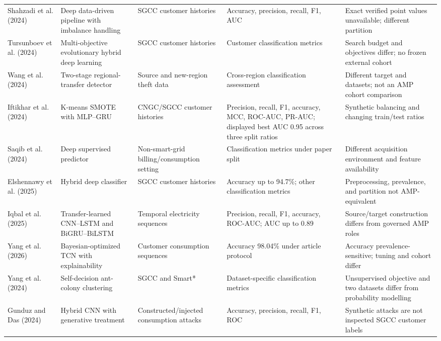 \begin{longtable}{@{}p{}p{}p{}p{}p{}@{}}
Shahzadi et al. (2024) & Deep data-driven pipeline with imbalance handling & SGCC customer histories & Accuracy, precision, recall, F1, AUC & Exact verified point values unavailable; different partition \\
Tursunboev et al. (2024) & Multi-objective evolutionary hybrid deep learning & SGCC customer histories & Customer classification metrics & Search budget and objectives differ; no frozen external cohort \\
Wang et al. (2024) & Two-stage regional-transfer detector & Source and new-region theft data & Cross-region classification assessment & Different target and datasets; not an AMP cohort comparison \\
Iftikhar et al. (2024) & K-means SMOTE with MLP--GRU & CNGC/SGCC customer histories & Precision, recall, F1, accuracy, MCC, ROC-AUC, PR-AUC; displayed best AUC 0.95 across three split ratios & Synthetic balancing and changing train/test ratios \\
Saqib et al. (2024) & Deep supervised predictor & Non-smart-grid billing/consumption setting & Classification metrics under paper split & Different acquisition environment and feature availability \\
Elshennawy et al. (2025) & Hybrid deep classifier & SGCC customer histories & Accuracy up to 94.7\%; other classification metrics & Preprocessing, prevalence, and partition not AMP-equivalent \\
Iqbal et al. (2025) & Transfer-learned CNN--LSTM and BiGRU--BiLSTM & Temporal electricity sequences & Precision, recall, F1, accuracy, ROC-AUC; AUC up to 0.89 & Source/target construction differs from governed AMP roles \\
Yang et al. (2026) & Bayesian-optimized TCN with explainability & Customer consumption sequences & Accuracy 98.04\% under article protocol & Accuracy prevalence-sensitive; tuning and cohort differ \\
Yang et al. (2024) & Self-decision ant-colony clustering & SGCC and Smart* & Dataset-specific classification metrics & Unsupervised objective and two datasets differ from probability modelling \\
Gunduz and Das (2024) & Hybrid CNN with generative treatment & Constructed/injected consumption attacks & Accuracy, precision, recall, F1, ROC & Synthetic attacks are not inspected SGCC customer labels \\
\end{longtable}
\endgroup
